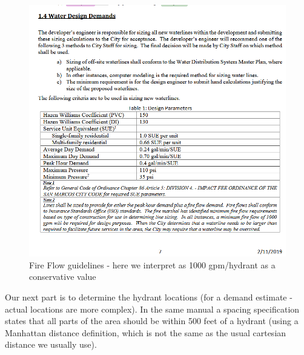 \documentclass[12pt]{article}
\begin{document}
\begin{enumerate}
\begin{enumerate}[a)]
\begin{figure}[h!] %
   \centering
   \includegraphics[width=5.5in]{Hydrants-0.png} 
   \caption{Fire Flow guidelines - here we interpret as 1000 gpm/hydrant as a conservative value}
   \label{fig:hydrant0}
\end{figure}

\clearpage

Our next part is to determine the hydrant locations (for a demand estimate - actual locations are more complex).   In the same manual a spacing specification states that all parts of the area should be within 500 feet of a hydrant (using a Manhattan distance definition, which is not the same as the usual cartesian distance we usually use).


\end{enumerate}
\end{enumerate}
\end{document}
